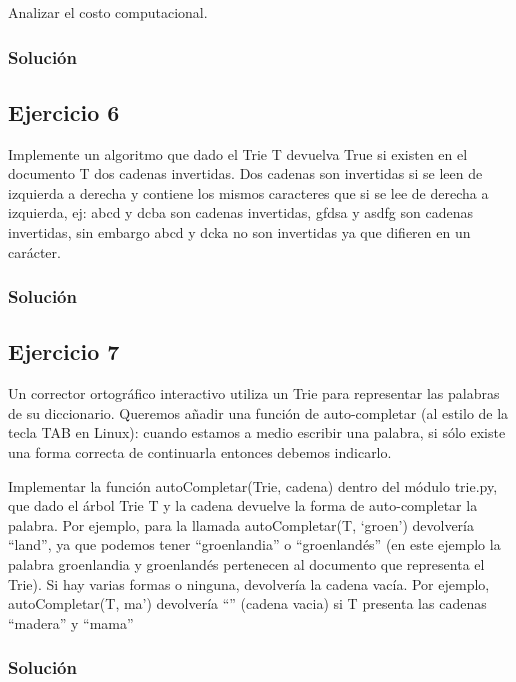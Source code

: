 \documentclass{article}
\begin{document}
Analizar el costo computacional.
\subsubsection*{Solución}


\subsection*{Ejercicio 6}
Implemente un algoritmo que dado el Trie T devuelva True si existen en el documento T dos cadenas invertidas. Dos cadenas son invertidas si se leen de izquierda a derecha y contiene los mismos caracteres que si se lee de derecha a izquierda, ej: abcd y dcba son cadenas invertidas, gfdsa y asdfg son cadenas invertidas, sin embargo abcd y dcka no son invertidas ya que difieren en un carácter.
\subsubsection*{Solución}


\subsection*{Ejercicio 7}
Un corrector ortográfico interactivo utiliza un Trie para representar las palabras de su diccionario. Queremos añadir una función de auto-completar (al estilo de la tecla TAB en Linux): cuando estamos a medio escribir una palabra, si sólo existe una forma correcta de continuarla entonces debemos indicarlo.

Implementar la función autoCompletar(Trie, cadena) dentro del módulo trie.py, que dado el árbol Trie T y la cadena devuelve la forma de auto-completar la palabra. Por ejemplo, para la llamada autoCompletar(T, ‘groen’) devolvería “land”, ya que podemos tener “groenlandia” o “groenlandés” (en este ejemplo la palabra groenlandia y groenlandés pertenecen al documento que representa el Trie). Si hay varias formas o ninguna, devolvería la cadena vacía. Por ejemplo, autoCompletar(T, ma’) devolvería “” (cadena vacia) si T presenta las cadenas “madera” y “mama”
\subsubsection*{Solución}
\end{document}

